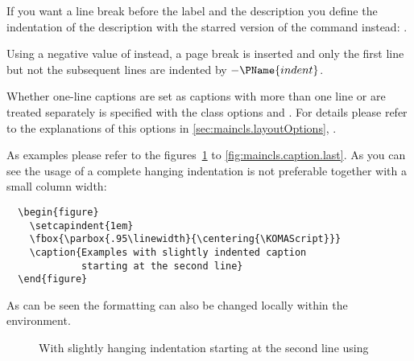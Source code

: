 If you want a line break before the label and the description you
define the indentation  of the description with the
starred version of the command instead: .

Using a negative value of  instead, a page break is
inserted and only the first line but not the subsequent lines are
indented by \(-\PName{indent}\).

Whether one-line captions are set as captions with more than one line
or are treated separately is specified with the class options
 and . For details
please refer to the explanations of this options in
\autoref{sec:maincls.layoutOptions},
.

\begin{Example}
  As examples please refer to the
  figures~\ref{fig:maincls.caption.first} to
  \ref{fig:maincls.caption.last}. As you can see the usage of a
  complete hanging indentation is not preferable together with a small
  column width:
\begin{lstlisting}
  \begin{figure}
    \setcapindent{1em}
    \fbox{\parbox{.95\linewidth}{\centering{\KOMAScript}}}
    \caption{Examples with slightly indented caption
             starting at the second line}
  \end{figure}
\end{lstlisting}
  As can be seen the formatting can also be changed locally within the
   environment.
  \begin{figure}
    \centering%
    \begin{minipage}{.9\linewidth}
      \begin{minipage}[t]{.48\linewidth}\sloppy
        \caption[Example for figure caption]%
        {\sloppy Equivalent to the standard setting, similar to the
          usage of }
        \label{fig:maincls.caption.first}
      \end{minipage}
      \hspace{.02\linewidth}
      \begin{minipage}[t]{.48\linewidth}\sloppy
        \setcapindent{1em}
        \caption[Example for figure caption]%
        {With slightly hanging indentation starting at the second line
         using \PParameter{1em}}
      \end{minipage}
    \end{minipage}


\end{figure}
\end{Example}
